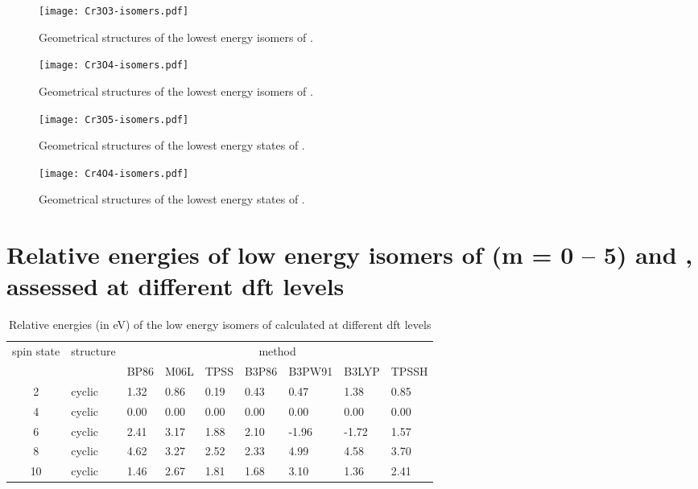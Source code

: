 \begin{refsection}
\begin{figure}[]
	\centering
	\texttt{[image: Cr3O3-isomers.pdf]}
	\caption{Geometrical structures of the lowest energy isomers of .}
	\label{a7fig:Cr3O3-isomers}
\end{figure}

\begin{figure}[]
	\centering
	\texttt{[image: Cr3O4-isomers.pdf]}
	\caption{Geometrical structures of the lowest energy isomers of .}
	\label{a7fig:Cr3O4-isomers}
\end{figure}

\begin{figure}[]
	\centering
	\texttt{[image: Cr3O5-isomers.pdf]}
	\caption{Geometrical structures of the lowest energy states of .}
	\label{a7fig:Cr3O5-isomers}
\end{figure}

\begin{figure}[]
	\centering
	\texttt{[image: Cr4O4-isomers.pdf]}
	\caption{Geometrical structures of the lowest energy states of .}
	\label{a7fig:Cr4O4-isomers}
\end{figure}

\newpage

\section[Relataive energies of \ch{C\lowercase{r}3O_{\lowercase{m}}^+} (\lowercase{m} = 0 -- 5) and \ch{C\lowercase{r}4O4+}]{Relative energies of low energy isomers of  (\lowercase{m} = 0 -- 5) and , assessed at different \acrshort{dft} levels}

\begin{table}[h]
    \centering
    \small
	\caption{Relative energies (in eV) of the low energy isomers of  calculated at different \acrshort{dft} levels}
	\label{a7tbl:Cr3}
	\begin{tabular}{cllllllll}
		\hline
		\multirow{2}{*}{spin state} & \multirow{2}{*}{structure} & \multicolumn{7}{c}{method}                          \\ \cline{3-9} 
		    &         & BP86 & M06L & TPSS & B3P86 & B3PW91 & B3LYP & TPSSH \\ \hline
        2   & cyclic  & 1.32 & 0.86 & 0.19 & 0.43  & 0.47   & 1.38  & 0.85  \\
        4   & cyclic  & 0.00 & 0.00 & 0.00 & 0.00  & 0.00   & 0.00  & 0.00  \\
        6   & cyclic  & 2.41 & 3.17 & 1.88 & 2.10  & -1.96  & -1.72 & 1.57  \\
        8   & cyclic  & 4.62 & 3.27 & 2.52 & 2.33  & 4.99   & 4.58  & 3.70  \\
        10  & cyclic  & 1.46 & 2.67 & 1.81 & 1.68  & 3.10   & 1.36  & 2.41  \\ \hline 
	\end{tabular}
\end{table}



\end{refsection}
